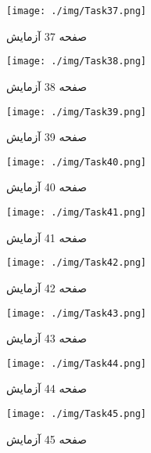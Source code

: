 {    %
    \begin{figure}[htpb]
        \centering
        \texttt{[image: ./img/Task37.png]}
        \caption{ صفحه 37 آزمایش }
        \label{fig:Task37}
    \end{figure}


    \begin{figure}[htpb]
        \centering
        \texttt{[image: ./img/Task38.png]}
        \caption{ صفحه 38 آزمایش }
        \label{fig:Task38}
    \end{figure}


    \begin{figure}[htpb]
        \centering
        \texttt{[image: ./img/Task39.png]}
        \caption{ صفحه 39 آزمایش }
        \label{fig:Task39}
    \end{figure}


    \begin{figure}[htpb]
        \centering
        \texttt{[image: ./img/Task40.png]}
        \caption{ صفحه 40 آزمایش }
        \label{fig:Task40}
    \end{figure}


    \begin{figure}[htpb]
        \centering
        \texttt{[image: ./img/Task41.png]}
        \caption{ صفحه 41 آزمایش }
        \label{fig:Task41}
    \end{figure}


    \begin{figure}[htpb]
        \centering
        \texttt{[image: ./img/Task42.png]}
        \caption{ صفحه 42 آزمایش }
        \label{fig:Task42}
    \end{figure}


    \begin{figure}[htpb]
        \centering
        \texttt{[image: ./img/Task43.png]}
        \caption{ صفحه 43 آزمایش }
        \label{fig:Task43}
    \end{figure}


    \begin{figure}[htpb]
        \centering
        \texttt{[image: ./img/Task44.png]}
        \caption{ صفحه 44 آزمایش }
        \label{fig:Task44}
    \end{figure}


    \begin{figure}[htpb]
        \centering
        \texttt{[image: ./img/Task45.png]}
        \caption{ صفحه 45 آزمایش }
        \label{fig:Task45}
    \end{figure}


}
